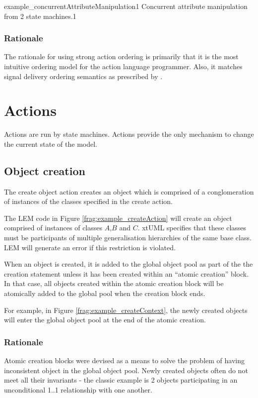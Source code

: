 	{example_concurrentAttributeManipulation1}
	{Concurrent attribute manipulation from 2 state machines.}{1}

\subsubsection{Rationale}
The rationale for using strong action ordering is primarily that it is the
most intuitive ordering model for the action language programmer. Also, it
matches signal delivery ordering semantics as prescribed by \cite{mellor:2002}.

\section{Actions}
Actions are run by state machines. Actions provide the only mechanism to
change the current state of the model.

\subsection{Object creation}
\label{sec:objectCreation}

The create object action creates an object which is comprised of a
conglomeration of instances of the classes specified in the create action.


The LEM code in Figure \ref{frag:example_createAction} will create an object 
comprised of instances of classes $A$,$B$ and $C$. xtUML specifies that these
classes must be participants of multiple generalisation hierarchies of the same
base class. LEM will generate an error if this restriction is violated.

When an object is created, it is added to the global object pool as part of
the the creation statement unless it has been created within an ``atomic
creation'' block. In that case, all objects created within the atomic creation
block will be atomically added to the global pool when the creation block ends.


For example, in Figure \ref{frag:example_createContext}, the newly created
objects will enter the global object pool at the end of the atomic creation.

\subsubsection{Rationale}
Atomic creation blocks were devised as a means to solve the problem of having
inconsistent object in the global object pool. Newly created objects often do
not meet all their invariants - the classic example is 2 objects participating
in an unconditional 1..1 relationship with one another.

